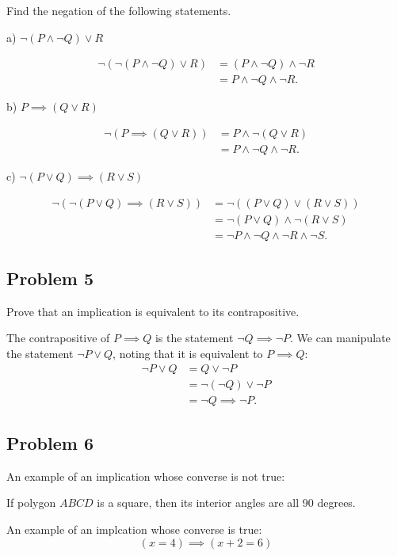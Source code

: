 \documentclass[11pt]{article}
\begin{document}
Find the negation of the following statements.

a) $\lnot(P \land \lnot Q) \lor R$

$$
\begin{array}{rl}
\lnot (\lnot(P \land \lnot Q) \lor R) &= (P \land \lnot Q) \land \lnot R \\
&= P \land \lnot Q \land \lnot R.
\end{array}
$$

b) $P \implies (Q \lor R)$

$$
\begin{array}{rl}
\lnot (P \implies (Q \lor R)) &= P \land \lnot (Q \lor R) \\
&= P \land \lnot Q \land \lnot R.
\end{array}
$$

c) $\lnot (P \lor Q) \implies (R \lor S)$

$$
\begin{array}{rl}
\lnot (\lnot (P \lor Q) \implies (R \lor S))
&= \lnot ((P \lor Q) \lor (R \lor S)) \\
&= \lnot (P \lor Q) \land \lnot (R \lor S) \\
&= \lnot P \land \lnot Q \land \lnot R \land \lnot S.
\end{array}
$$
\subsection*{Problem 5}

Prove that an implication is equivalent to its contrapositive.

The contrapositive of $P \implies Q$ is the statement
$\lnot Q \implies \lnot P$. We can manipulate the statement $\lnot P \lor Q$, noting
that it is equivalent to $P \implies Q$:
$$
\begin{array}{rl}
\lnot P \lor Q &= Q \lor \lnot P \\
&= \lnot (\lnot Q) \lor \lnot P \\
&= \lnot Q \implies \lnot P.
\end{array}
$$

\subsection*{Problem 6}
An example of an implication whose converse is not true:

If polygon $ABCD$ is a square, then its interior angles are all 90 degrees.

An example of an implcation whose converse is true:
\[ (x = 4) \implies (x+2 = 6) \]
\end{document}
